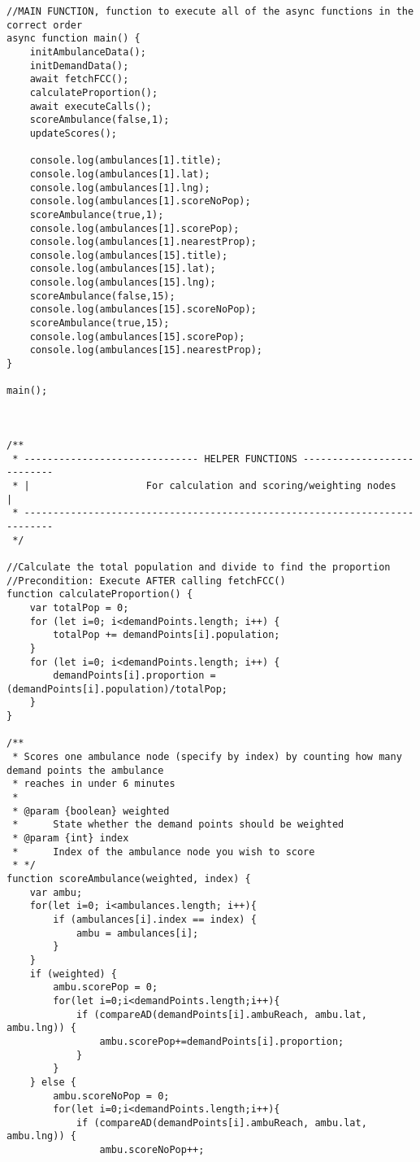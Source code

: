 \documentclass{article}
\newenvironment{code}{\captionsetup{type=listing}}{}
\begin{document}
\begin{code}
\begin{verbatim}
//MAIN FUNCTION, function to execute all of the async functions in the correct order
async function main() {
    initAmbulanceData();
    initDemandData();
    await fetchFCC();
    calculateProportion();
    await executeCalls();
    scoreAmbulance(false,1);
    updateScores();

    console.log(ambulances[1].title);
    console.log(ambulances[1].lat);
    console.log(ambulances[1].lng);
    console.log(ambulances[1].scoreNoPop);
    scoreAmbulance(true,1);
    console.log(ambulances[1].scorePop);
    console.log(ambulances[1].nearestProp);
    console.log(ambulances[15].title);
    console.log(ambulances[15].lat);
    console.log(ambulances[15].lng);
    scoreAmbulance(false,15);
    console.log(ambulances[15].scoreNoPop);
    scoreAmbulance(true,15);
    console.log(ambulances[15].scorePop);
    console.log(ambulances[15].nearestProp);
}

main();



/**
 * ------------------------------ HELPER FUNCTIONS ---------------------------
 * |                    For calculation and scoring/weighting nodes          |
 * ---------------------------------------------------------------------------
 */

//Calculate the total population and divide to find the proportion
//Precondition: Execute AFTER calling fetchFCC()
function calculateProportion() {
    var totalPop = 0;
    for (let i=0; i<demandPoints.length; i++) {
        totalPop += demandPoints[i].population;
    }
    for (let i=0; i<demandPoints.length; i++) {
        demandPoints[i].proportion = (demandPoints[i].population)/totalPop;
    }
}

/**
 * Scores one ambulance node (specify by index) by counting how many demand points the ambulance 
 * reaches in under 6 minutes
 * 
 * @param {boolean} weighted
 *      State whether the demand points should be weighted
 * @param {int} index
 *      Index of the ambulance node you wish to score
 * */
function scoreAmbulance(weighted, index) {
    var ambu;
    for(let i=0; i<ambulances.length; i++){
        if (ambulances[i].index == index) {
            ambu = ambulances[i];
        }
    }
    if (weighted) {
        ambu.scorePop = 0;
        for(let i=0;i<demandPoints.length;i++){
            if (compareAD(demandPoints[i].ambuReach, ambu.lat, ambu.lng)) {
                ambu.scorePop+=demandPoints[i].proportion;
            }
        }
    } else {
        ambu.scoreNoPop = 0;
        for(let i=0;i<demandPoints.length;i++){
            if (compareAD(demandPoints[i].ambuReach, ambu.lat, ambu.lng)) {
                ambu.scoreNoPop++;


\end{verbatim}
\end{code}
\end{document}
